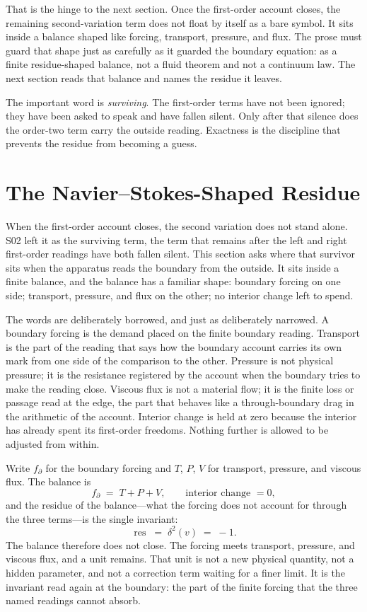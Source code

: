 That is the hinge to the next section. Once the first-order account closes, the remaining
second-variation term does not float by itself as a bare symbol. It sits inside a balance shaped
like forcing, transport, pressure, and flux. The prose must guard that shape just as carefully as
it guarded the boundary equation: as a finite residue-shaped balance, not a fluid theorem and not
a continuum law. The next section reads that balance and names the residue it leaves.

The important word is \emph{surviving}. The first-order terms have not been ignored; they have
been asked to speak and have fallen silent. Only after that silence does the order-two term carry
the outside reading. Exactness is the discipline that prevents the residue from becoming a guess.

\section{The Navier--Stokes-Shaped Residue}

When the first-order account closes, the second variation does not stand alone. S02 left it as the
surviving term, the term that remains after the left and right first-order readings have both
fallen silent. This section asks where that survivor sits when the apparatus reads the boundary
from the outside. It sits inside a finite balance, and the balance has a familiar shape: boundary
forcing on one side; transport, pressure, and flux on the other; no interior change left to spend.

The words are deliberately borrowed, and just as deliberately narrowed. A boundary forcing is the
demand placed on the finite boundary reading. Transport is the part of the reading that says how
the boundary account carries its own mark from one side of the comparison to the other. Pressure is
not physical pressure; it is the resistance registered by the account when the boundary tries to
make the reading close. Viscous flux is not a material flow; it is the finite loss or passage read
at the edge, the part that behaves like a through-boundary drag in the arithmetic of the account.
Interior change is held at zero because the interior has already spent its first-order freedoms.
Nothing further is allowed to be adjusted from within.

Write \(f_{\partial}\) for the boundary forcing and \(T\), \(P\), \(V\) for transport, pressure,
and viscous flux. The balance is
\[
  f_{\partial} \;=\; T + P + V,
  \qquad
  \text{interior change } = 0,
\]
and the residue of the balance---what the forcing does not account for through the three
terms---is the single invariant:
\[
  \operatorname{res} \;=\; \delta^{2}(v) \;=\; -1.
\]
The balance therefore does not close. The forcing meets transport, pressure, and viscous flux, and
a unit remains. That unit is not a new physical quantity, not a hidden parameter, and not a
correction term waiting for a finer limit. It is the invariant read again at the boundary: the part
of the finite forcing that the three named readings cannot absorb.

